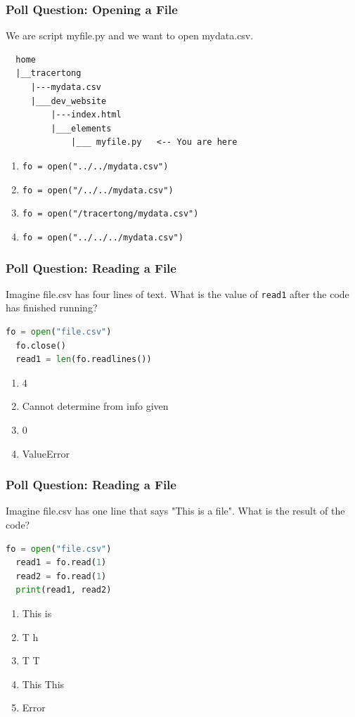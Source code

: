 \documentclass{beamer}
\begin{document}
%
%
\begin{frame}[fragile]
  \frametitle{Poll Question: Opening a File}
  We are script myfile.py and we want to open mydata.csv.
  \begin{lstlisting}
  home
  |__tracertong
     |---mydata.csv
     |___dev_website
         |---index.html
         |___elements
             |___ myfile.py   <-- You are here
  \end{lstlisting} 
  \vfill
  \begin{enumerate}[A]
    \item \lstinline|fo = open("../../mydata.csv")|
    \item \lstinline|fo = open("/../../mydata.csv")|
    \item \lstinline|fo = open("/tracertong/mydata.csv")|
    \item \lstinline|fo = open("../../../mydata.csv")|
  \end{enumerate}
\end{frame}

%
%
\begin{frame}[fragile]
  \frametitle{Poll Question: Reading a File}
  Imagine file.csv has four lines of text. What is the value of \lstinline|read1| after the code has finished running?
  \begin{lstlisting}[language=Python, autogobble]
  fo = open("file.csv")
  fo.close()
  read1 = len(fo.readlines())
  \end{lstlisting} 
  \vfill
  \begin{enumerate}[A]
    \item 4
    \item Cannot determine from info given
    \item 0
    \item ValueError
  \end{enumerate}
\end{frame}


%
%
\begin{frame}[fragile]
  \frametitle{Poll Question: Reading a File}
  Imagine file.csv has one line that says "This is a file". What is the result of the code?
  \begin{lstlisting}[language=Python, autogobble]
  fo = open("file.csv")
  read1 = fo.read(1)
  read2 = fo.read(1)
  print(read1, read2)
  \end{lstlisting} 
  \vfill
  \begin{enumerate}[A]
    \item This is
    \item T h
    \item T T
    \item This This
    \item Error
  \end{enumerate}
\end{frame}
\end{document}
